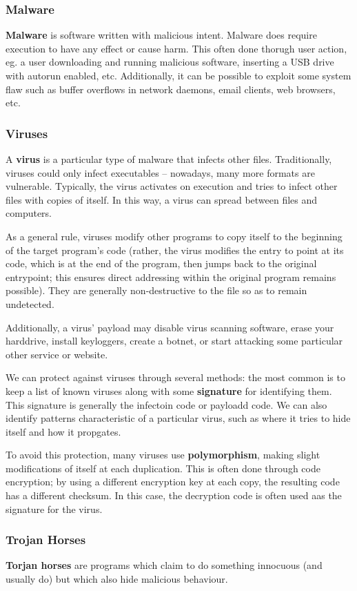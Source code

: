 \documentclass[12pt]{article}
\begin{document}
\subsubsection{Malware}
{\bf Malware} is software written with malicious intent. Malware does require execution to have any effect or cause harm. This often done thorugh user action, eg. a user downloading and running malicious software, inserting a USB drive with autorun enabled, etc. Additionally, it can be possible to exploit some system flaw such as buffer overflows in network daemons, email clients, web browsers, etc.

\subsubsection{Viruses}
A {\bf virus} is a particular type of malware that infects other files. Traditionally, viruses could only infect executables -- nowadays, many more formats are vulnerable. Typically, the virus activates on execution and tries to infect other files with copies of itself. In this way, a virus can spread between files and computers.

As a general rule, viruses modify other programs to copy itself to the beginning of the target program's code (rather, the virus modifies the entry to point at its code, which is at the end of the program, then jumps back to the original entrypoint; this ensures direct addressing within the original program remains possible). They are generally non-destructive to the file so as to remain undetected.

Additionally, a virus' payload may disable virus scanning software, erase your harddrive, install keyloggers, create a botnet, or start attacking some particular other service or website.

We can protect against viruses through several methods: the most common is to keep a list of known viruses along with some {\bf signature} for identifying them. This signature is generally the infectoin code or payloadd code. We can also identify patterns characteristic of a particular virus, such as where it tries to hide itself and how it propgates.

To avoid this protection, many viruses use {\bf polymorphism}, making slight modifications of itself at each duplication. This is often done through code encryption; by using a different encryption key at each copy, the resulting code has a different checksum. In this case, the decryption code is often used aas the signature for the virus.

\subsubsection{Trojan Horses}
{\bf Torjan horses} are programs which claim to do something innocuous (and usually do) but which also hide malicious behaviour.
\end{document}
